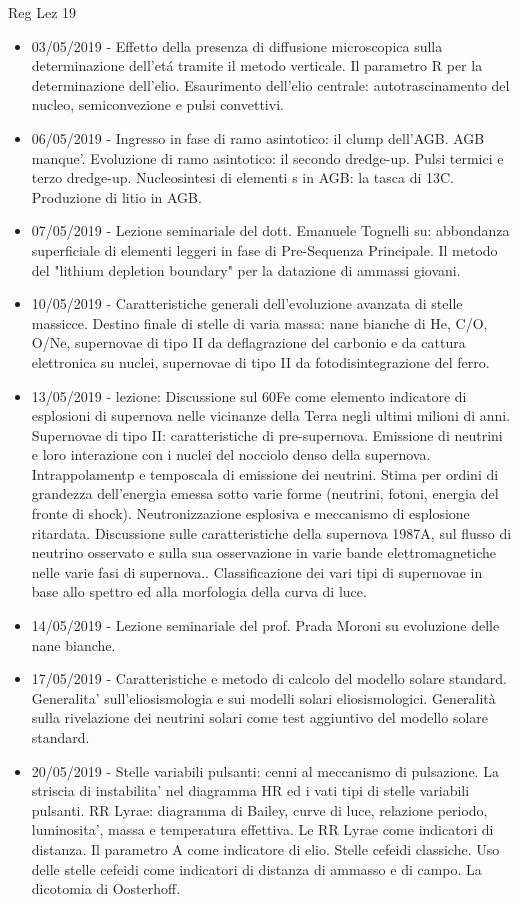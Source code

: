 \begin{frame}[allowframebreaks]{Reg Lez 19}
\begin{itemize}
\item 03/05/2019 - Effetto della presenza di diffusione microscopica sulla determinazione dell'et\'a tramite il metodo verticale. Il parametro R per la determinazione dell'elio. Esaurimento dell'elio centrale: autotrascinamento del nucleo, semiconvezione e pulsi convettivi.
\item 06/05/2019 - Ingresso in fase di ramo asintotico: il clump dell'AGB. AGB manque'. Evoluzione di ramo asintotico: il secondo dredge-up. Pulsi termici e terzo dredge-up. Nucleosintesi di elementi s in AGB: la tasca di 13C. Produzione di litio in AGB.

\item 07/05/2019 - Lezione seminariale del dott. Emanuele Tognelli su: abbondanza superficiale di elementi leggeri in fase di Pre-Sequenza Principale. Il metodo del "lithium depletion boundary" per la datazione di ammassi giovani.
\item 10/05/2019 - Caratteristiche generali dell'evoluzione avanzata di stelle massicce. Destino finale di stelle di varia massa: nane bianche di He, C/O, O/Ne, supernovae di tipo II da deflagrazione del carbonio e da cattura elettronica su nuclei, supernovae di tipo II da fotodisintegrazione del ferro.
\item 13/05/2019 - lezione: Discussione sul 60Fe come elemento indicatore di esplosioni di supernova nelle vicinanze della Terra negli ultimi milioni di anni. Supernovae di tipo II: caratteristiche di pre-supernova. Emissione di neutrini e loro interazione con i nuclei del nocciolo denso della supernova. Intrappolamentp e temposcala di emissione dei neutrini. Stima per ordini di grandezza dell'energia emessa sotto varie forme (neutrini, fotoni, energia del fronte di shock). Neutronizzazione esplosiva e meccanismo di esplosione ritardata. Discussione sulle caratteristiche della supernova 1987A, sul flusso di neutrino osservato e sulla sua osservazione in varie bande elettromagnetiche nelle varie fasi di supernova.. Classificazione dei vari tipi di supernovae in base allo spettro ed alla morfologia della curva di luce.
\item 14/05/2019 - Lezione seminariale del prof. Prada Moroni su evoluzione delle nane bianche.
\item 17/05/2019 - Caratteristiche e metodo di calcolo del modello solare standard. Generalita' sull'eliosismologia e sui modelli solari eliosismologici. Generalità sulla rivelazione dei neutrini solari come test aggiuntivo del modello solare standard.
\item 20/05/2019 - Stelle variabili pulsanti: cenni al meccanismo di pulsazione. La striscia di instabilita' nel diagramma HR ed i vati tipi di stelle variabili pulsanti. RR Lyrae: diagramma di Bailey, curve di luce, relazione periodo, luminosita', massa e temperatura effettiva. Le RR Lyrae come indicatori di distanza. Il parametro A come indicatore di elio. Stelle cefeidi classiche. Uso delle stelle cefeidi come indicatori di distanza di ammasso e di campo. La dicotomia di Oosterhoff.

\end{itemize}
\end{frame}
